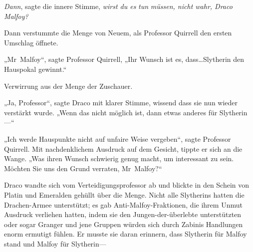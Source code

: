 \emph{Dann}, sagte die innere Stimme, \emph{wirst du es} \emph{tun} \emph{müssen, nicht wahr, Draco Malfoy?}

Dann verstummte die Menge von Neuem, als Professor Quirrell den ersten Umschlag öffnete.

„Mr~Malfoy“, sagte Professor Quirrell, „Ihr Wunsch ist es, dass…Slytherin den Hauspokal gewinnt.“

Verwirrung aus der Menge der Zuschauer.

„Ja, Professor“, sagte Draco mit klarer Stimme, wissend dass sie nun wieder verstärkt wurde. „Wenn das nicht möglich ist, dann etwas anderes für Slytherin—“

„Ich werde Hauspunkte nicht auf unfaire Weise vergeben“, sagte Professor Quirrell. Mit nachdenklichem Ausdruck auf dem Gesicht, tippte er sich an die Wange. „Was ihren Wunsch schwierig genug macht, um interessant zu sein. Möchten Sie uns den Grund verraten, Mr~Malfoy?“

Draco wandte sich vom Verteidigungsprofessor ab und blickte in den Schein von Platin und Emeralden gehüllt über die Menge. Nicht alle Slytherins hatten die Drachen-Armee unterstützt; es gab Anti-Malfoy-Fraktionen, die ihrem Unmut Ausdruck verliehen hatten, indem sie den Jungen-der-überlebte unterstützten oder sogar Granger und jene Gruppen würden sich durch Zabinis Handlungen enorm ermutigt fühlen. Er musste sie daran erinnern, dass Slytherin für Malfoy stand und Malfoy für Slytherin—

